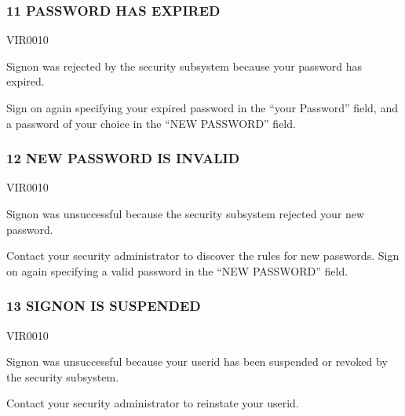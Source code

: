 \documentclass[letterpaper,10pt,english]{sphinxmanual}
\begin{document}
\subsubsection{11 PASSWORD HAS EXPIRED}
\label{\detokenize{messages:password-has-expired}}\begin{description}
\sphinxAtStartPar
VIR0010

\sphinxAtStartPar
Signon was rejected by the security subsystem because your password has expired.

\sphinxAtStartPar
Sign on again specifying your expired password in the “your Password” field, and a password of your choice in the “NEW PASSWORD” field.

\end{description}


\subsubsection{12 NEW PASSWORD IS INVALID}
\label{\detokenize{messages:new-password-is-invalid}}\begin{description}
\sphinxAtStartPar
VIR0010

\sphinxAtStartPar
Signon was unsuccessful because the security subsystem rejected your new password.

\sphinxAtStartPar
Contact your security administrator to discover the rules for new passwords. Sign on again specifying a valid password in the “NEW PASSWORD” field.

\end{description}


\subsubsection{13 SIGNON IS SUSPENDED}
\label{\detokenize{messages:signon-is-suspended}}\begin{description}
\sphinxAtStartPar
VIR0010

\sphinxAtStartPar
Signon was unsuccessful because your userid has been suspended or revoked by the security subsystem.

\sphinxAtStartPar
Contact your security administrator to reinstate your userid.

\end{description}
\end{document}
